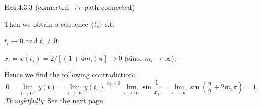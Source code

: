 \documentclass{article}
\begin{document}
\begin{Th}{Ex4.4.3.3 (connected $\nRightarrow$ path-connected)}
\begin{compactenum}
    \end{compactenum}
    Then we obtain a sequence $\{t_i\}$ s.t.
    \begin{compactenum}
        \item $t_i\rightarrow 0$ and $t_i\neq 0$;
        \item $x_i = x(t_i) = 2/[(1+4m_i)\pi]\rightarrow 0$ (since $m_i\rightarrow\infty$);
    \end{compactenum}
    Hence we find the following contradiction:
    $$ 0 = \lim\limits_{t\to 0^+} y(t) = \lim\limits_{i\to\infty} y(t_i) \overset{x_i\neq 0}{=} \lim\limits_{i\to\infty} \sin\frac{1}{x_i} = \lim\limits_{i\to\infty} \sin\left(\frac{\pi}{2}+2m_i\pi\right) = 1. $$
    \textcolor{P}{\textit{Thoughtfully}: See the next page.}
\end{Th}
\end{document}
